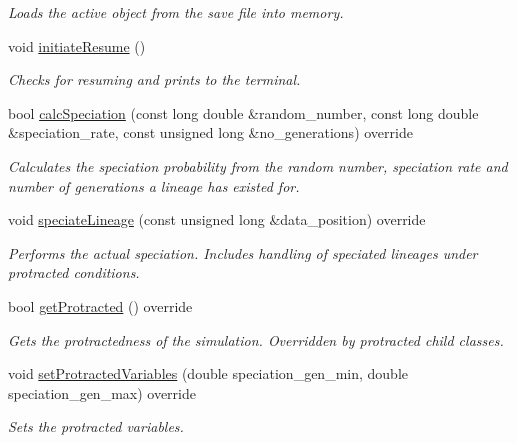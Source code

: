 \begin{DoxyCompactItemize}
\begin{DoxyCompactList}\small\item\em Loads the active object from the save file into memory. \end{DoxyCompactList}\item 
void \hyperlink{class_tree_a8cfe5d30d53d702f18cd67981e2c9acb}{initiate\+Resume} ()\hypertarget{class_tree_a8cfe5d30d53d702f18cd67981e2c9acb}{}\label{class_tree_a8cfe5d30d53d702f18cd67981e2c9acb}

\begin{DoxyCompactList}\small\item\em Checks for resuming and prints to the terminal. \end{DoxyCompactList}\item 
bool \hyperlink{class_protracted_tree_af9690f122e77c0a60d363af3e818c9a2}{calc\+Speciation} (const long double \&random\+\_\+number, const long double \&speciation\+\_\+rate, const unsigned long \&no\+\_\+generations) override
\begin{DoxyCompactList}\small\item\em Calculates the speciation probability from the random number, speciation rate and number of generations a lineage has existed for. \end{DoxyCompactList}\item 
void \hyperlink{class_protracted_tree_aaa2f1db86b0fd49a69d0809bd1c1fb81}{speciate\+Lineage} (const unsigned long \&data\+\_\+position) override
\begin{DoxyCompactList}\small\item\em Performs the actual speciation. Includes handling of speciated lineages under protracted conditions. \end{DoxyCompactList}\item 
bool \hyperlink{class_protracted_tree_ab0bb05fbdeb2aa75a3d3128ded3d655b}{get\+Protracted} () override
\begin{DoxyCompactList}\small\item\em Gets the protractedness of the simulation. Overridden by protracted child classes. \end{DoxyCompactList}\item 
void \hyperlink{class_protracted_tree_a6e04aa92dd30e889a468d9b9fc6fd58d}{set\+Protracted\+Variables} (double speciation\+\_\+gen\+\_\+min, double speciation\+\_\+gen\+\_\+max) override
\begin{DoxyCompactList}\small\item\em Sets the protracted variables. \end{DoxyCompactList}\item 

\end{DoxyCompactItemize}
